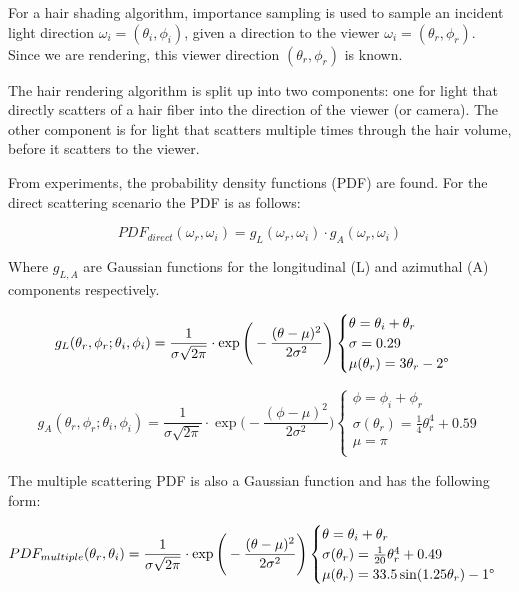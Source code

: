 \documentclass[10pt,a4paper]{article}
\begin{document}
For a hair shading algorithm, importance sampling is used to sample an incident light direction $\omega_i = (\theta_i, \phi_i)$, given a direction to the viewer $\omega_i = (\theta_r, \phi_r)$. Since we are rendering, this viewer direction $(\theta_r, \phi_r)$ is known. 

The hair rendering algorithm is split up into two components: one for light that directly scatters of a hair fiber into the direction of the viewer (or camera). The other component is for light that scatters multiple times through the hair volume, before it scatters to the viewer.

From experiments, the probability density functions (PDF) are found. For the direct scattering scenario the PDF is as follows:


\begin{equation}
PDF_{direct}(\omega_r, \omega_i) = g_L(\omega_r, \omega_i) \cdot g_A(\omega_r, \omega_i)
\end{equation}

Where $g_{L,A}$ are Gaussian functions for the longitudinal (L) and azimuthal (A) components respectively.

\begin{equation}
g_L(\theta_r, \phi_r; \theta_i, \phi_i) = \frac{1}{\sigma \sqrt{2\pi}} \cdot \exp \Bigg(-\frac{(\theta - \mu)^2}{2\sigma^2} \Bigg) 
\begin{cases}
\theta = \theta_i + \theta_r \\
\sigma = 0.29 \\
\mu(\theta_r) = 3\theta_r - 2\degree \\
\end{cases}
\end{equation}

\begin{equation}
g_A(\theta_r, \phi_r; \theta_i, \phi_i) = \frac{1}{\sigma \sqrt{2\pi}} \cdot \exp \Bigg(-\frac{(\phi - \mu)^2}{2\sigma^2} \Bigg) 
\begin{cases}
\phi = \phi_i + \phi_r \\
\sigma(\theta_r) = \frac{1}{4} \theta_r^4 + 0.59 \\
\mu = \pi \\
\end{cases}
\end{equation}


The multiple scattering PDF is also a Gaussian function and has the following form:

\begin{equation}
PDF_{multiple}(\theta_r, \theta_i) = \frac{1}{\sigma \sqrt{2\pi}} \cdot \exp \Bigg(-\frac{(\theta - \mu)^2}{2\sigma^2} \Bigg) 
\begin{cases}
\theta = \theta_i + \theta_r \\
\sigma(\theta_r) = \frac{1}{20} \theta_r^4 + 0.49 \\
\mu(\theta_r) = 33.5 \sin(1.25\theta_r) - 1\degree \\
\end{cases}
\end{equation}
\end{document}
